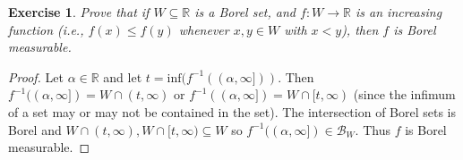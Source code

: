 \documentclass{article}
\newtheorem{exercise}[theorem]{Exercise}
\begin{document}
\begin{exercise}
    Prove that if $W \subseteq \mathbb{R}$ is a Borel set, and $f : W \to \mathbb{R}$ is an increasing function (i.e., $f(x) \leq f(y)$ whenever $x, y \in W$ with $x < y$), then $f$ is Borel measurable.
\end{exercise}
\begin{proof}
    Let $\alpha\in\mathbb{R}$ and let $t=\text{inf}(f^{-1}((\alpha,\infty]))$. Then $f^{-1}((\alpha,\infty])=W\cap (t,\infty)$ or  $f^{-1}((\alpha,\infty])=W\cap [t,\infty)$ (since the infimum of a set may or may not be contained in the set). The intersection of Borel sets is Borel and $W\cap (t,\infty),W\cap [t,\infty)\subseteq W$ so $f^{-1}((\alpha,\infty])\in\mathcal{B}_W$. Thus $f$ is Borel measurable.
\end{proof}
\end{document}
